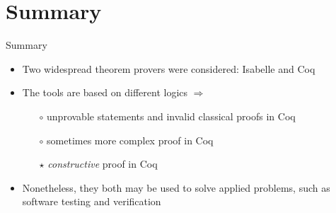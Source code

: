 \documentclass[aspectratio=169, 12pt, fleqn]{beamer}
\begin{document}





\section*{Summary}

\begin{frame}{Summary}
  \begin{itemize}
  \item
    Two widespread theorem provers were considered: \textcolor{dkblue}{Isabelle} and \textcolor{dkblue}{Coq}
  \item
    The tools are based on \textcolor{dkblue}{different logics} $\Rightarrow$
    \begin{itemize}
      \item[$\circ$] unprovable statements and invalid classical proofs in Coq
      \item[$\circ$] sometimes more complex proof in Coq
      \item[$\star$] \textit{constructive} proof in Coq
    \end{itemize}
  \item
    Nonetheless, they both may be used to solve applied problems, such as software testing and verification
   
 \end{itemize}


\end{frame}
\end{document}
